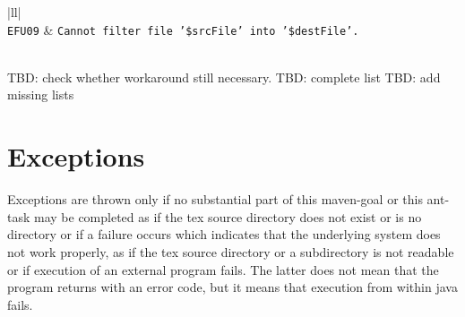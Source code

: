 \begin{longtable}{|ll|}
 \\
\texttt{\footnotesize EFU09}  & \texttt{\footnotesize Cannot filter file '\$srcFile' into '\$destFile'. } \\
 \\
\end{longtable}
TBD\@: check whether workaround still necessary. 
TBD\@: complete list
TBD\@: add missing lists 


\section{Exceptions}\label{sec:exception}

Exceptions are thrown only if no substantial part of 
this maven-goal or this ant-task may be completed 
as if the tex source directory does not exist or is no directory 
or if a failure occurs which indicates 
that the underlying system does not work properly, 
as if the tex source directory or a subdirectory is not readable 
or if execution of an external program fails. 
The latter does not mean that the program returns with an error code, 
but it means that execution from within java fails.

